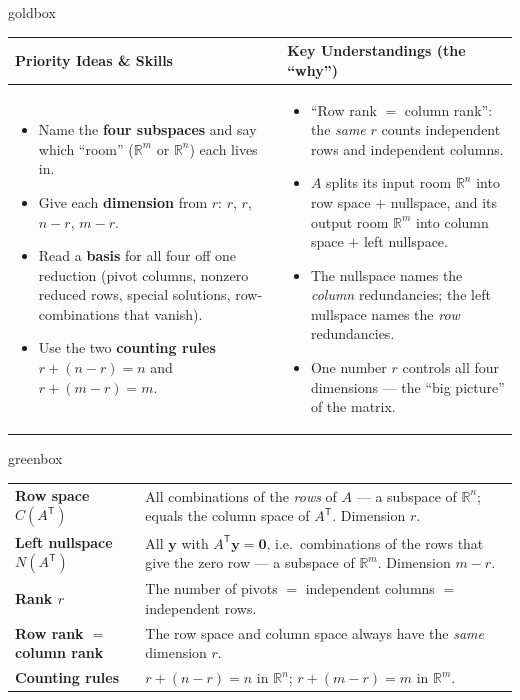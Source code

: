 \documentclass[10pt]{article}
\newcommand{\yy}{\mathbf{y}}
\newcommand{\zero}{\mathbf{0}}
\newcommand{\T}{\mathsf{T}}
\begin{document}
\renewcommand{\arraystretch}{1.4}
\begin{skillbox}{goldbox}
\begin{tabularx}{\linewidth}{@{}X|X@{}}
\textbf{Priority Ideas \& Skills} & \textbf{Key Understandings (the ``why'')} \\[2pt]
\hline
\vspace{-6pt}
\begin{itemize}[leftmargin=1.1em, nosep, after=\vspace{2pt}]
  \item Name the \textbf{four subspaces} and say which ``room'' ($\mathbb{R}^m$ or $\mathbb{R}^n$) each lives in.
  \item Give each \textbf{dimension} from $r$: $r$, $r$, $n-r$, $m-r$.
  \item Read a \textbf{basis} for all four off one reduction (pivot columns, nonzero reduced rows, special solutions, row-combinations that vanish).
  \item Use the two \textbf{counting rules} $r+(n-r)=n$ and $r+(m-r)=m$.
\end{itemize}
&
\vspace{-6pt}
\begin{itemize}[leftmargin=1.1em, nosep, after=\vspace{2pt}]
  \item ``Row rank $=$ column rank'': the \emph{same} $r$ counts independent rows and independent columns.
  \item $A$ splits its input room $\mathbb{R}^n$ into row space $+$ nullspace, and its output room $\mathbb{R}^m$ into column space $+$ left nullspace.
  \item The nullspace names the \emph{column} redundancies; the left nullspace names the \emph{row} redundancies.
  \item One number $r$ controls all four dimensions --- the ``big picture'' of the matrix.
\end{itemize}
\end{tabularx}
\end{skillbox}

\begin{skillbox}{greenbox}
\renewcommand{\arraystretch}{1.3}
\begin{tabularx}{\linewidth}{@{}l X@{}}
\textbf{Row space $C(A^{\T})$} & All combinations of the \emph{rows} of $A$ --- a subspace of $\mathbb{R}^n$; equals the column space of $A^{\T}$. Dimension $r$. \\
\textbf{Left nullspace $N(A^{\T})$} & All $\yy$ with $A^{\T}\yy=\zero$, i.e.\ combinations of the rows that give the zero row --- a subspace of $\mathbb{R}^m$. Dimension $m-r$. \\
\textbf{Rank $r$} & The number of pivots $=$ independent columns $=$ independent rows. \\
\textbf{Row rank $=$ column rank} & The row space and column space always have the \emph{same} dimension $r$. \\
\textbf{Counting rules} & $r+(n-r)=n$ in $\mathbb{R}^n$; \; $r+(m-r)=m$ in $\mathbb{R}^m$. \\
\end{tabularx}
\end{skillbox}
\end{document}
